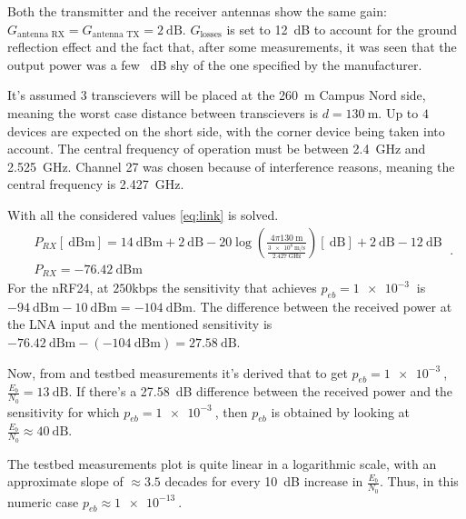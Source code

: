Both the transmitter and the receiver antennas show the same gain: $G_{\text{antenna RX}} = G_{\text{antenna TX}} = \SI{2}{\dB}$. $G_{\text{losses}}$ is set to \SI{12}{\dB} to account for the ground reflection effect and the fact that, after some measurements, it was seen that the output power was a few \SI{}{\dB} shy of the one specified by the manufacturer.

It's assumed $3$ transcievers will be placed at the \SI{260}{\m} Campus Nord side, meaning the worst case distance between transcievers is $d = \SI{130}{\m}$. Up to $4$ devices are expected on the short side, with the corner device being taken into account. The central frequency of operation must be between \SI{2.4}{\GHz} and \SI{2.525}{\GHz}. Channel 27 was chosen because of interference reasons, meaning the central frequency is \SI{2.427}{\GHz}.

With all the considered values \eqref{eq:link} is solved.
\begin{equation}
	\begin{split}
		& P_{RX} \left[ \SI{}{\dB}\text{m} \right] = \SI{14}{\dB}\text{m} +  \SI{2}{\dB}  - 20 \log\left( \frac{4 \pi \SI{130}{\m}}{\frac{\SI{3e8}{\m\per\s}}{\SI{2.427}{\GHz}}} \right) \left[ \SI{}{\dB} \right] + \SI{2}{\dB} - \SI{12}{\dB} \\
		& P_{RX} = - \SI{76.42}{\dB}\text{m}
	\end{split} \ .
\end{equation}
For the nRF24, at $250$kbps the sensitivity that achieves $p_{eb} = \SI{1e-3}{}$ is $- \SI{94}{\dB}\text{m} - \SI{10}{\dB}\text{m} = - \SI{104}{\dB}\text{m}$. The difference between the received power at the LNA input and the mentioned sensitivity is $- \SI{76.42}{\dB}\text{m} - \left( - \SI{104}{\dB}\text{m} \right) = \SI{27.58}{\dB}$.

Now, from  and testbed measurements it's derived that to get $p_{eb} = \SI{1e-3}{}$, $\frac{E_b}{N_0} = \SI{13}{\dB}$. If there's a \SI{27.58}{\dB} difference between the received power and the sensitivity for which $p_{eb} = \SI{1e-3}{}$, then $p_{eb}$ is obtained by looking at $\frac{E_b}{N_0} \approx \SI{40}{\dB}$. 

The testbed measurements plot is quite linear in a logarithmic scale, with an approximate slope of $\approx 3.5$ decades for every \SI{10}{\dB} increase in $\frac{E_b}{N_0}$. Thus, in this numeric case $p_{eb} \approx \SI{1e-13}{}$.


